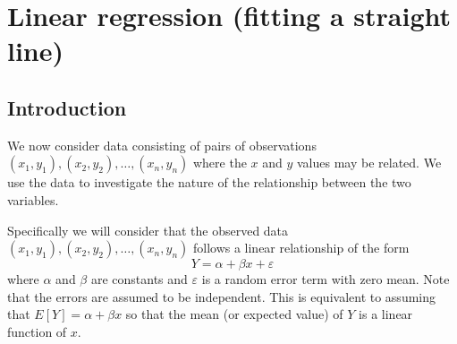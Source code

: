 \documentclass[12pt]{article}
\theoremstyle{break}
\begin{document}
%


\newpage
\section{Linear regression (fitting a straight line)}
\subsection{Introduction}
We now consider data consisting of pairs of observations $(x_{1},y_{1}),(x_{2},y_{2}),\dots,(x_{n},y_{n})$ where the $x$ and $y$ values may be related. We use the data to investigate the nature of the relationship between the two variables.

Specifically we will consider that the observed data $(x_{1},y_{1}),(x_{2},y_{2}),\dots,(x_{n},y_{n})$  follows a linear relationship of the form $$Y=\alpha+\beta x +\varepsilon$$
where $\alpha$ and $\beta$ are constants and $\varepsilon$ is a random error term with zero mean. Note that the errors are assumed to be independent. This is equivalent to assuming that $E[Y]=\alpha+\beta x$ so that the mean (or expected value) of $Y$ is a linear function of $x$.
\end{document}
